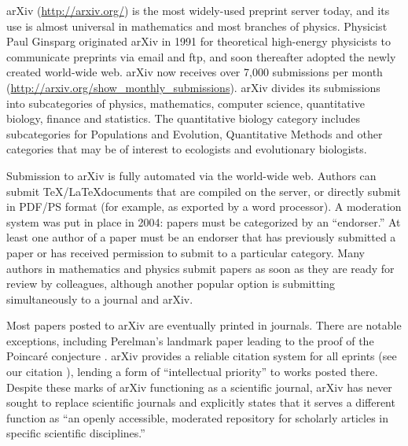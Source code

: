 \documentclass[letterpaper,twocolumn,superscriptaddress,showkeys]{revtex4}
\begin{document}
%

arXiv (\url{http://arxiv.org/}) is the most widely-used preprint server today,
and its use is almost universal in mathematics and most branches of physics.
Physicist Paul Ginsparg originated arXiv in 1991 for theoretical high-energy
physicists to communicate preprints via email and ftp, and soon thereafter
adopted the newly created world-wide web\cite{jackson2002preprints}.  arXiv now
receives over 7,000 submissions per month
(\url{http://arxiv.org/show_monthly_submissions}).  arXiv divides its
submissions into subcategories of physics, mathematics, computer science,
quantitative biology, finance and statistics.  The quantitative biology category
includes subcategories for Populations and Evolution, Quantitative Methods and
other categories that may be of interest to ecologists and evolutionary
biologists.

Submission to arXiv is fully automated via the world-wide web.  Authors can
submit \TeX/\LaTeX documents that are compiled on the server, or directly submit
in PDF/PS format (for example, as exported by a word processor).  A moderation
system was put in place in 2004: papers must be categorized by an ``endorser.''
At least one author of a paper must be an endorser that has previously submitted
a paper or has received permission to submit to a particular category.  Many
authors in mathematics and physics submit papers as soon as they are ready for
review by colleagues, although another popular option is submitting
simultaneously to a journal and arXiv.

Most papers posted to arXiv are eventually printed in journals.  There are
notable exceptions, including Perelman's landmark paper leading to the proof of
the Poincar\'{e} conjecture \cite{2002math.....11159P}.  arXiv provides a
reliable citation system for all eprints (see our citation
\cite{2002math.....11159P}), lending a form of ``intellectual priority'' to
works posted there.  Despite these marks of arXiv functioning as a scientific
journal, arXiv has never sought to replace scientific journals and explicitly
states that it serves a different function as ``an openly accessible, moderated
repository for scholarly articles in specific scientific disciplines.''
\end{document}
